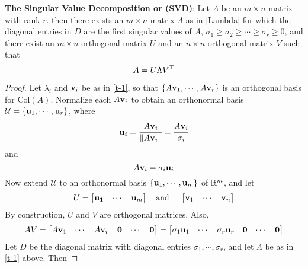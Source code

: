 \begin{Thm}
    \textbf{The Singular Value Decomposition or (SVD)}: 
    Let $A$ be an $m\times n$ matrix with rank $r$. then there exists an $m\times n$ matrix $\Lambda$ as in \cref{Lambda} for which the diagonal entries in $D$ are the first singular values of $A$, $\sigma_1\geq \sigma_2\geq \cdots \geq \sigma_r\geq 0$, and there exist an $m\times n$ orthogonal matrix $U$ and an $n\times n$ orthogonal matrix $V$ such that
    \begin{equation*}
        A = U\Lambda V^{\top}
    \end{equation*}
    \begin{proof}
        Let $\lambda_i$ and $\mathbf{v}_i$ be as in \cref{t-1}, so that $\{A\mathbf{v}_1, \cdots, A\mathbf{v}_r \}$ is an orthogonal basis for $\text{Col}(A)$. Normalize each $A\mathbf{v}_i$ to obtain an orthonormal basis $\mathcal{U} = \{\mathbf{u}_1, \cdots, \mathbf{u}_r \}$, where
        \begin{equation}
            \mathbf{u}_i = \cfrac{A\mathbf{v}_i}{\lVert A\mathbf{v}_i \rVert} = \cfrac{A\mathbf{v}_i}{\sigma_i}
        \end{equation} and 
        \begin{equation}
            A\mathbf{v}_i = \sigma_i \mathbf{u}_i
        \end{equation} Now extend $\mathcal{U}$ to an orthonormal basis $\{ 
\mathbf{u}_1, \cdots, \mathbf{u}_m \}$ of $\mathbb{R}^m$, and let 
        \begin{equation}
            U = \begin{bmatrix}
                \mathbf{u_1} & \cdots & \mathbf{u}_m
            \end{bmatrix} \quad \text{and }\quad \begin{bmatrix}
                    \mathbf{v}_1 & \cdots & \mathbf{v}_n
                \end{bmatrix}
        \end{equation} By construction, $U$ and $V$ are orthogonal matrices. Also,
        \begin{equation}
            AV = \begin{bmatrix}
                A\mathbf{v}_1 & \cdots & A\mathbf{v}_r & \mathbf{0} & \cdots & \mathbf{0} 
            \end{bmatrix} = \begin{bmatrix}
                    \sigma_1\mathbf{u}_1 & \cdots & \sigma_r\mathbf{u}_r & \mathbf{0} & \cdots & \mathbf{0}
                \end{bmatrix}
        \end{equation} Let $D$ be the diagonal matrix with diagonal entries $\sigma_1,\cdots, \sigma_r$, and let $\Lambda$ be as in \cref{t-1} above. Then

\end{proof}
\end{Thm}
